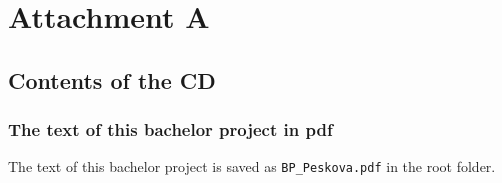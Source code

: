 \chapter*{Attachment A}

\section*{Contents of the CD}

\subsection*{The text of this bachelor project in pdf}
The text of this bachelor project is saved as \verb-BP_Peskova.pdf- in the root folder. 
